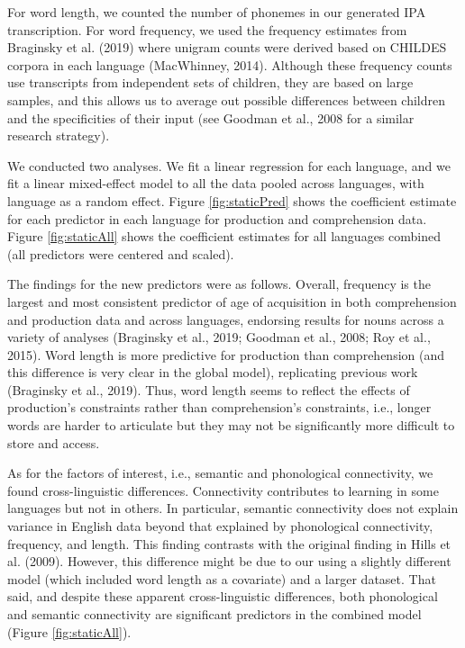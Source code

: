 \documentclass[english,,man,floatsintext]{apa6}
\begin{document}
For word length, we counted the number of phonemes in our generated IPA transcription. For word frequency, we used the frequency estimates from Braginsky et al. (2019) where unigram counts were derived based on CHILDES corpora in each language (MacWhinney, 2014). Although these frequency counts use transcripts from independent sets of children, they are based on large samples, and this allows us to average out possible differences between children and the specificities of their input (see Goodman et al., 2008 for a similar research strategy).

We conducted two analyses. We fit a linear regression for each language, and we fit a linear mixed-effect model to all the data pooled across languages, with language as a random effect. Figure \ref{fig:staticPred} shows the coefficient estimate for each predictor in each language for production and comprehension data. Figure \ref{fig:staticAll} shows the coefficient estimates for all languages combined (all predictors were centered and scaled).

The findings for the new predictors were as follows. Overall, frequency is the largest and most consistent predictor of age of acquisition in both comprehension and production data and across languages, endorsing results for nouns across a variety of analyses (Braginsky et al., 2019; Goodman et al., 2008; Roy et al., 2015). Word length is more predictive for production than comprehension (and this difference is very clear in the global model), replicating previous work (Braginsky et al., 2019). Thus, word length seems to reflect the effects of production's constraints rather than comprehension's constraints, i.e., longer words are harder to articulate but they may not be significantly more difficult to store and access.

As for the factors of interest, i.e., semantic and phonological connectivity, we found cross-linguistic differences. Connectivity contributes to learning in some languages but not in others. In particular, semantic connectivity does not explain variance in English data beyond that explained by phonological connectivity, frequency, and length. This finding contrasts with the original finding in Hills et al. (2009). However, this difference might be due to our using a slightly different model (which included word length as a covariate) and a larger dataset. That said, and despite these apparent cross-linguistic differences, both phonological and semantic connectivity are significant predictors in the combined model (Figure \ref{fig:staticAll}).
\end{document}
